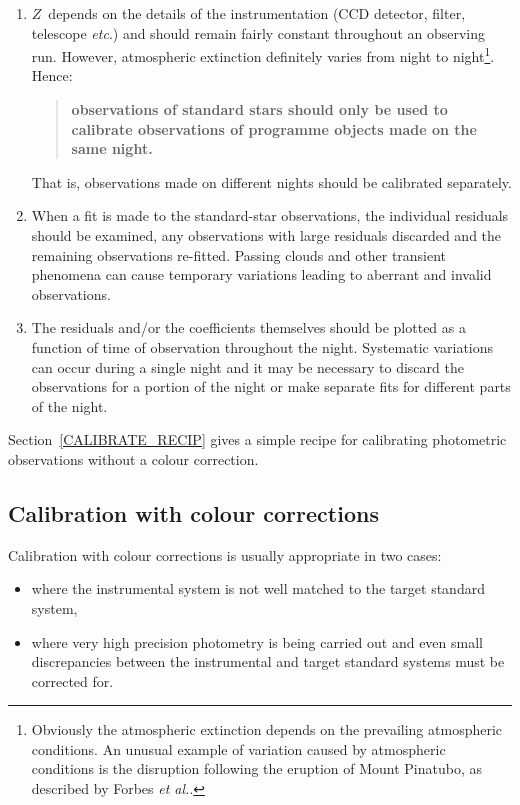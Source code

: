 \documentclass[twoside,11pt,nolof]{starlink}
\begin{document}
\begin{enumerate}

  \item $Z$\, depends on the details of the instrumentation (CCD detector,
   filter, telescope \emph{etc}.) and should remain fairly constant throughout
   an observing run.  However, atmospheric extinction definitely varies
   from night to night\footnote{Obviously the atmospheric extinction
   depends on the prevailing atmospheric conditions.  An unusual example
   of variation caused by atmospheric conditions is the disruption
   following the eruption of Mount Pinatubo, as described by Forbes \textit{et al.}\/\cite{FORBES95}.}.  Hence:

  \begin{quote}
   \textbf{observations of standard stars should only be used to calibrate
   observations of programme objects made on the same night.}
  \end{quote}

   That is, observations made on different nights should be calibrated
   separately.

  \item When a fit is made to the standard-star observations, the
   individual residuals should be examined, any observations with
   large residuals discarded and the remaining observations re-fitted.
   Passing clouds and other transient phenomena can cause temporary
   variations leading to aberrant and invalid observations.

  \item The residuals and/or the coefficients themselves should be
   plotted as a function of time of observation throughout the night.
   Systematic variations can occur during a single night and it may
   be necessary to discard the observations for a portion of the night
   or make separate fits for different parts of the night.

\end{enumerate}

Section~\ref{CALIBRATE_RECIP} gives a simple recipe for calibrating
photometric observations without a colour correction.

\subsection{Calibration with colour corrections}

Calibration with colour corrections is usually appropriate in two
cases:

\begin{itemize}

  \item where the instrumental system is not well matched to the target
   standard system,

  \item where very high precision photometry is being carried out and
   even small discrepancies between the instrumental and target standard
   systems must be corrected for.

\end{itemize}
\end{document}
